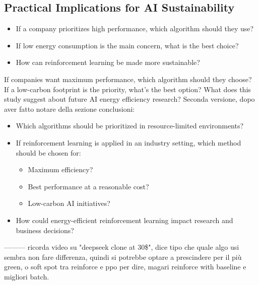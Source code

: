 \subsection{Practical Implications for AI Sustainability}
\begin{itemize}
	\item If a company prioritizes high performance, which algorithm should they use?
	\item If low energy consumption is the main concern, what is the best choice?
	\item How can reinforcement learning be made more sustainable?
\end{itemize}
If companies want maximum performance, which algorithm should they choose?
If a low-carbon footprint is the priority, what’s the best option?
What does this study suggest about future AI energy efficiency research?
Seconda versione, dopo aver fatto notare della sezione conclusioni:
\begin{itemize}
	\item Which algorithms should be prioritized in resource-limited environments?
	\item If reinforcement learning is applied in an industry setting, which method should be chosen for:
	\begin{itemize}
		\item Maximum efficiency?
		\item Best performance at a reasonable cost?
		\item Low-carbon AI initiatives?
	\end{itemize}
	\item How could energy-efficient reinforcement learning impact research and business decisions?
\end{itemize}
---------
ricorda video su "deepseek clone at 30\$", dice tipo che quale algo usi sembra non fare differenza, quindi si potrebbe optare a prescindere per il più green, o soft spot tra reinforce e ppo per dire, magari reinforce with baseline e migliori batch.

